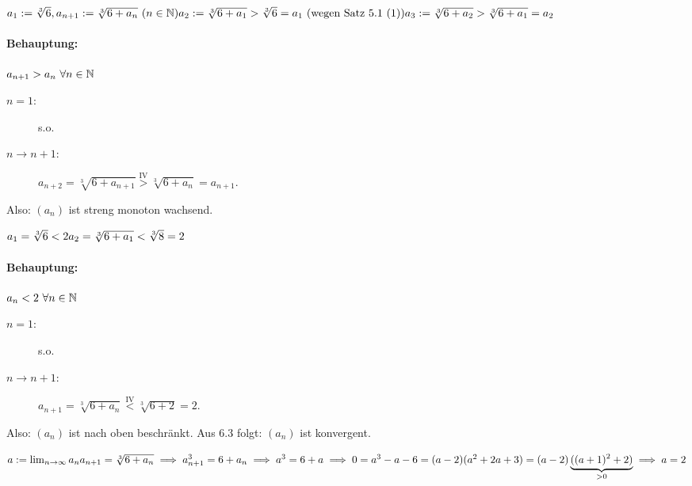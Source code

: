 \documentclass[a4paper,twoside,DIV15,BCOR12mm]{scrbook}
\begin{document}
\begin{beispiel}
\begin{math}
a_1:=\sqrt[3]{6}, a_{n+1}:=\sqrt[3]{6+a_n}\ (n\in\mathbb{N})\\
a_2:=\sqrt[3]{6+a_1} > \sqrt[3]{6}=a_1\text{ (wegen Satz 5.1 (1))}\\
a_3:=\sqrt[3]{6+a_2} > \sqrt[3]{6+a_1}=a_2
\end{math}

\paragraph{Behauptung:}
$a_{n+1}>a_n\ \forall n\in\mathbb{N}$

\begin{beweis}
\begin{description}
\item[$n=1$:] s.o.
\item[$n\longrightarrow n+1$:] $a_{n+2}=\sqrt[3]{6+a_{n+1}} \stackrel{\text{IV}}{>} \sqrt[3]{6+a_n}=a_{n+1}.$
\end{description}
\end{beweis}

Also: $(a_n)$ ist streng monoton wachsend.

\begin{math}
a_1=\sqrt[3]{6} < 2\\
a_2=\sqrt[3]{6+a_1} < \sqrt[3]{8}=2
\end{math}

\paragraph{Behauptung:}
$a_n<2\ \forall n\in\mathbb{N}$

\begin{beweis}
\begin{description}
\item[$n=1$:] s.o.
\item[$n\longrightarrow n+1$:] $a_{n+1}=\sqrt[3]{6+a_n} \stackrel{\text{IV}}{<} \sqrt[3]{6+2}=2.$
\end{description}
\end{beweis}

Also: $(a_n)$ ist nach oben beschränkt. Aus 6.3 folgt: $(a_n)$ ist konvergent.

\begin{math}
a:=\lim_{n\rightarrow\infty}{a_n}\\
a_{n+1}=\sqrt[3]{6+a_n} \implies a_{n+1}^3=6+a_n \implies a^3=6+a\\
\implies 0=a^3-a-6=(a-2)(a^2+2a+3)=(a-2)\underbrace{((a+1)^2+2)}_{>0} \implies a=2
\end{math}
\end{beispiel}
\end{document}
